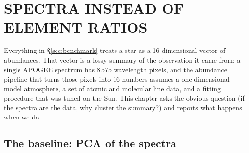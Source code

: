 \section{SPECTRA INSTEAD OF ELEMENT RATIOS}
\label{sec:spectral}


Everything in \S\ref{sec:benchmark} treats a star as a 16-dimensional vector of
abundances. That vector is a lossy summary of the observation it came from: a
single APOGEE spectrum has 8\,575 wavelength pixels, and the abundance pipeline
that turns those pixels into 16 numbers assumes a one-dimensional model
atmosphere, a set of atomic and molecular line data, and a fitting procedure
that was tuned on the Sun. This chapter asks the obvious question (if the
spectra are the data, why cluster the summary?) and reports what happens when
we do.

\begin{marginnote}[]
\end{marginnote}

\subsection{The baseline: PCA of the spectra}

